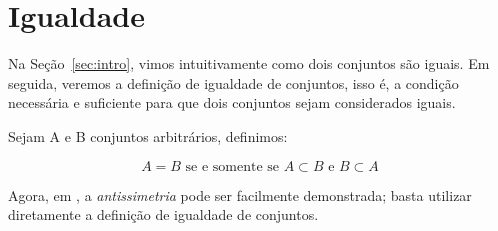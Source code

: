 \section{Igualdade}

Na Seção~\ref{sec:intro}, vimos intuitivamente como dois conjuntos são iguais. Em seguida, veremos a definição de igualdade de conjuntos, isso é, a condição necessária e suficiente para que dois conjuntos sejam considerados iguais.

\begin{definition}
\label{def:=}
Sejam A e B conjuntos arbitrários, definimos:

	$$ A = B \text{ se e somente se } A \subset B \text{ e } B \subset A $$

\end{definition}

\begin{remark}
	Agora, em , a \textit{antissimetria} pode ser facilmente demonstrada; basta utilizar diretamente a definição de igualdade de conjuntos.
\end{remark}

